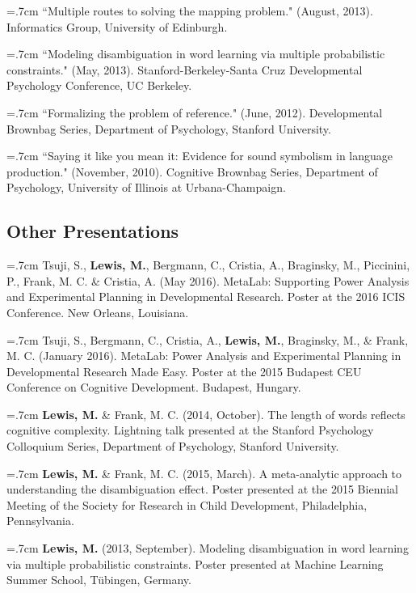 \documentclass[letterpaper]{article}
\begin{document}
\hangindent=.7cm ``Multiple routes to solving the mapping problem." (August, 2013). Informatics Group, University of Edinburgh.
 
\hangindent=.7cm ``Modeling disambiguation in word learning via multiple probabilistic constraints." (May, 2013). Stanford-Berkeley-Santa Cruz Developmental Psychology Conference, UC Berkeley.

\hangindent=.7cm ``Formalizing the problem of reference."  (June, 2012). Developmental Brownbag Series, Department of Psychology, Stanford University.

\hangindent=.7cm ``Saying it like you mean it: Evidence for sound symbolism in language production." (November, 2010). Cognitive Brownbag Series, Department of Psychology, University of Illinois at Urbana-Champaign.

\subsection*{Other Presentations}

\onehalfspacing



\hangindent=.7cm  Tsuji, S., {\bf Lewis, M.}, Bergmann, C., Cristia, A.,  Braginsky, M.,  Piccinini, P., Frank, M. C. \& Cristia, A. (May 2016). MetaLab: Supporting Power Analysis and Experimental Planning in Developmental Research. Poster at the 2016 ICIS Conference. New Orleans, Louisiana.

\hangindent=.7cm  Tsuji, S., Bergmann, C., Cristia, A., {\bf Lewis, M.}, Braginsky, M., \& Frank, M. C. (January 2016). MetaLab: Power Analysis and Experimental Planning in Developmental Research Made Easy. Poster at the 2015 Budapest CEU Conference on Cognitive Development. Budapest, Hungary.

\hangindent=.7cm {\bf Lewis, M.} \& Frank, M. C. (2014, October). The length of words reflects cognitive complexity. Lightning talk presented at the Stanford Psychology Colloquium Series, Department of Psychology, Stanford University.

\hangindent=.7cm {\bf Lewis, M.} \& Frank, M. C. (2015, March). A meta-analytic approach to understanding the disambiguation effect. Poster presented at  the 2015 Biennial Meeting of the Society for Research in Child Development, Philadelphia, Pennsylvania.

 \hangindent=.7cm {\bf Lewis, M.} (2013, September). Modeling disambiguation in word learning via multiple probabilistic constraints. Poster presented at Machine Learning Summer School, T\"{u}bingen, Germany.
 
\end{document}
